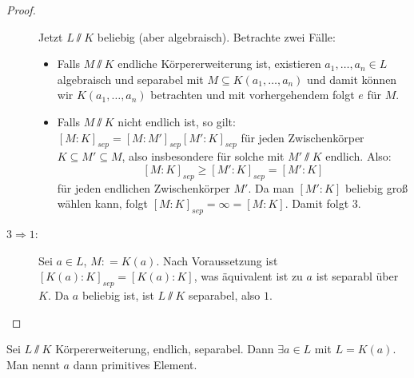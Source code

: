 \documentclass[12pt,a4paper]{scrartcl}
\begin{document}
\begin{proof}
\begin{description}
		Jetzt $L\sslash K$ beliebig (aber algebraisch). Betrachte zwei Fälle: \begin{itemize}
			\item Falls $M\sslash K$ endliche Körpererweiterung ist, existieren $a_1,\dots, a_n\in L$ algebraisch und separabel mit $M\subseteq K(a_1,\dots, a_n)$ und damit können wir $K(a_1,\dots, a_n)$ betrachten und mit vorhergehendem folgt $e$ für $M$.
			\item Falls $M\sslash K$ nicht endlich ist, so gilt: $[M:K]_{sep} = [M:M']_{sep}[M':K]_{sep}$ für jeden Zwischenkörper $K\subseteq M'\subseteq M$, also insbesondere für solche mit $M'\sslash K$ endlich. Also:
			$$[M:K]_{sep} \geq [M':K]_{sep} = [M':K]$$
			für jeden endlichen Zwischenkörper $M'$. Da man $[M':K]$ beliebig groß wählen kann, folgt $[M:K]_{sep} = \infty = [M:K]$. Damit folgt $3$.
		\end{itemize}
		\item[$3\Rightarrow 1$:] Sei $a\in L$, $M: = K(a)$. Nach Voraussetzung ist $[K(a):K]_{sep} = [K(a):K]$, was äquivalent ist zu $a$ ist separabl über $K$. Da $a$ beliebig ist, ist $L\sslash K$ separabel, also $1$.
	\end{description}
\end{proof}
\begin{satz}\label{thm:19.14}
	Sei $L\sslash K$ Körpererweiterung, endlich, separabel. Dann $\exists a\in L$ mit $L = K(a)$. Man nennt $a$ dann primitives Element.
\end{satz}
\end{document}
